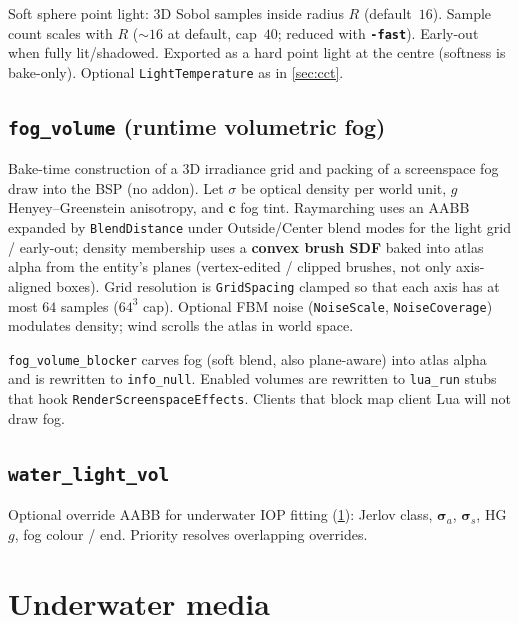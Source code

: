 \documentclass[11pt,a4paper]{article}
\newcommand{\flag}[1]{\texttt{\bfseries #1}}
\newcommand{\ent}[1]{\texttt{#1}}
\newcommand{\code}[1]{\texttt{#1}}
\newcommand{\vect}[1]{\bm{#1}}
\begin{document}
Soft sphere point light: 3D Sobol samples inside radius $R$ (default~$16$).
Sample count scales with $R$ ($\sim\!16$ at default, cap~$40$; reduced with
\flag{-fast}). Early-out when fully lit/shadowed. Exported as a hard point light
at the centre (softness is bake-only). Optional \code{LightTemperature} as in
\cref{sec:cct}.

\subsection{\ent{fog\_volume} (runtime volumetric fog)}
\label{sec:fogvol}

Bake-time construction of a 3D irradiance grid and packing of a screenspace
fog draw into the BSP (no addon). Let $\sigma$ be optical density per world
unit, $g$ Henyey--Greenstein anisotropy, and $\vect{c}$ fog tint.
Raymarching uses an AABB expanded by \code{BlendDistance} under Outside/Center
blend modes for the light grid / early-out; density membership uses a
\textbf{convex brush SDF} baked into atlas alpha from the entity's planes
(vertex-edited / clipped brushes, not only axis-aligned boxes).
Grid resolution is
\code{GridSpacing} clamped so that each axis has at most $64$ samples
($64^{3}$ cap). Optional FBM noise (\code{NoiseScale}, \code{NoiseCoverage})
modulates density; wind scrolls the atlas in world space.

\ent{fog\_volume\_blocker} carves fog (soft blend, also plane-aware) into atlas
alpha and is
rewritten to \code{info\_null}. Enabled volumes are rewritten to
\code{lua\_run} stubs that hook \code{RenderScreenspaceEffects}.
Clients that block map client Lua will not draw fog.

\subsection{\ent{water\_light\_vol}}

Optional override AABB for underwater IOP fitting (\cref{sec:underwater}):
Jerlov class, $\vect{\sigma}_a$, $\vect{\sigma}_s$, HG $g$, fog colour / end.
Priority resolves overlapping overrides.

\section{Underwater media}
\label{sec:underwater}
\end{document}
